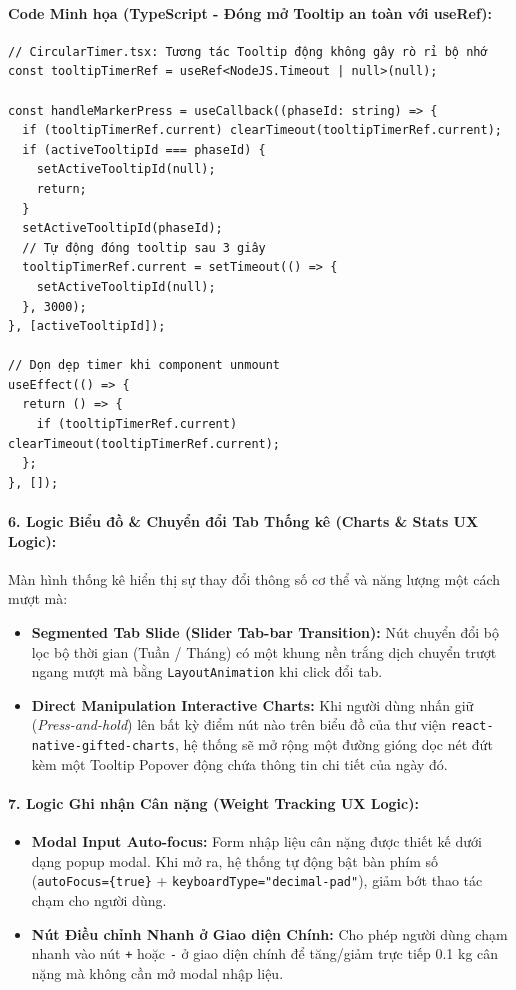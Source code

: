 \documentclass[12pt,a4paper]{article}
\begin{document}
\paragraph{Code Minh họa (TypeScript - Đóng mở Tooltip an toàn với useRef):}
\begin{verbatim}
// CircularTimer.tsx: Tương tác Tooltip động không gây rò rỉ bộ nhớ
const tooltipTimerRef = useRef<NodeJS.Timeout | null>(null);

const handleMarkerPress = useCallback((phaseId: string) => {
  if (tooltipTimerRef.current) clearTimeout(tooltipTimerRef.current);
  if (activeTooltipId === phaseId) {
    setActiveTooltipId(null);
    return;
  }
  setActiveTooltipId(phaseId);
  // Tự động đóng tooltip sau 3 giây
  tooltipTimerRef.current = setTimeout(() => {
    setActiveTooltipId(null);
  }, 3000);
}, [activeTooltipId]);

// Dọn dẹp timer khi component unmount
useEffect(() => {
  return () => {
    if (tooltipTimerRef.current) clearTimeout(tooltipTimerRef.current);
  };
}, []);
\end{verbatim}

\paragraph{6. Logic Biểu đồ \& Chuyển đổi Tab Thống kê (Charts \& Stats UX Logic):}
Màn hình thống kê hiển thị sự thay đổi thông số cơ thể và năng lượng một cách mượt mà:
\begin{itemize}
    \item \textbf{Segmented Tab Slide (Slider Tab-bar Transition):} Nút chuyển đổi bộ lọc bộ thời gian (Tuần / Tháng) có một khung nền trắng dịch chuyển trượt ngang mượt mà bằng \texttt{LayoutAnimation} khi click đổi tab.
    \item \textbf{Direct Manipulation Interactive Charts:} Khi người dùng nhấn giữ (\textit{Press-and-hold}) lên bất kỳ điểm nút nào trên biểu đồ của thư viện \texttt{react-native-gifted-charts}, hệ thống sẽ mở rộng một đường gióng dọc nét đứt kèm một Tooltip Popover động chứa thông tin chi tiết của ngày đó.
\end{itemize}

\paragraph{7. Logic Ghi nhận Cân nặng (Weight Tracking UX Logic):}
\begin{itemize}
    \item \textbf{Modal Input Auto-focus:} Form nhập liệu cân nặng được thiết kế dưới dạng popup modal. Khi mở ra, hệ thống tự động bật bàn phím số (\texttt{autoFocus=\{true\}} + \texttt{keyboardType="decimal-pad"}), giảm bớt thao tác chạm cho người dùng.
    \item \textbf{Nút Điều chỉnh Nhanh ở Giao diện Chính:} Cho phép người dùng chạm nhanh vào nút \texttt{+} hoặc \texttt{-} ở giao diện chính để tăng/giảm trực tiếp 0.1 kg cân nặng mà không cần mở modal nhập liệu.
\end{itemize}
\end{document}
